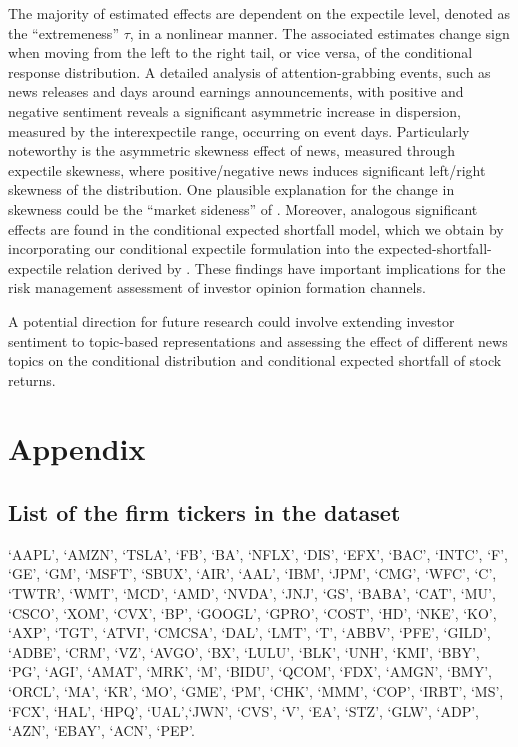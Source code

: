 \documentclass[11pt]{article}
\begin{document}
The majority of estimated effects are dependent on the expectile level, denoted as the ``extremeness'' \(\tau\), in a nonlinear manner. The associated estimates change sign when moving from the left to the right tail, or vice versa, of the conditional response distribution. A detailed analysis of attention-grabbing events, such as news releases and days around earnings announcements, with positive and negative sentiment reveals a significant asymmetric increase in dispersion, measured by the interexpectile range, occurring on event days. Particularly noteworthy is the asymmetric skewness effect of news, measured through expectile skewness, where positive/negative news induces significant left/right skewness of the distribution. One plausible explanation for the change in skewness could be the ``market sideness'' of \cite{SARKAR2009}. Moreover, analogous significant effects are found in the conditional expected shortfall model, which we obtain by incorporating our conditional expectile formulation into the expected-shortfall-expectile relation derived by \cite{Taylor2008}. These findings have important implications for the risk management assessment of investor opinion formation channels.

A potential direction for future research could involve extending investor sentiment to topic-based representations and assessing the effect of different news topics on the conditional distribution and conditional expected shortfall of stock returns.







\newpage
\hypertarget{appendix}{
\section*{Appendix}\label{appendix}}

\hypertarget{list-of-the-firm-tickers-in-the-dataset}{%
\subsection*{List of the firm tickers in the dataset}\label{list-of-the-firm-tickers-in-the-dataset}}

`AAPL', `AMZN', `TSLA', `FB', `BA', `NFLX', `DIS', `EFX', `BAC', `INTC', `F', `GE', `GM',
`MSFT', `SBUX', `AIR', `AAL', `IBM', `JPM', `CMG', `WFC', `C',
`TWTR',
`WMT', `MCD', `AMD', `NVDA', `JNJ', `GS',
`BABA', `CAT', `MU', `CSCO', `XOM', `CVX', `BP', `GOOGL', `GPRO', `COST', `HD', `NKE', `KO',
`AXP', `TGT',
`ATVI',
`CMCSA', `DAL', `LMT', `T', `ABBV', `PFE', `GILD', `ADBE', `CRM', `VZ', `AVGO', `BX',
`LULU', `BLK', `UNH', `KMI', `BBY', `PG', `AGI', `AMAT', `MRK', `M', `BIDU', `QCOM', `FDX', `AMGN',
`BMY', `ORCL',
 `MA', `KR', `MO', `GME', `PM', `CHK', `MMM',
`COP', `IRBT', `MS',
`FCX', `HAL', `HPQ', `UAL',`JWN', `CVS', `V', `EA', `STZ', `GLW', `ADP', `AZN', `EBAY', `ACN', `PEP'.
\end{document}

